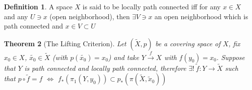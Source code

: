 \documentclass[11pt,a4paper]{article}
\theoremstyle{definition}
\newtheorem{definition}{Definition}[section]
\theoremstyle{plain}
\newtheorem{theorem}[definition]{Theorem}
\theoremstyle{remark}
\newcommand{\1}{\mathbbm{1}}
\begin{document}
\begin{definition}
    A space $X$ is said to be locally path connected iff for any $x \in X$ and any $U \ni x$ (open neighborhood), then $\exists V \ni x$ 
    an open neighborhood which is path connected and $x \in V \subset U$
\end{definition}

\begin{theorem}[The Lifting Criterion]
    Let $(\tilde{X}, p)$ be a covering space of $X$, fix $x_0 \in X$, $\tilde{x_0} \in \tilde{X}$ (with $p(\tilde{x_0}) = x_0$) and 
    take $Y \xrightarrow{f} X$ with $f(y_0) = x_0$. Suppose that $Y$ is path connected and locally path connected, therefore 
    $\exists ! \ \tilde{f} \colon Y \to \tilde{X}$ such that $p \circ \tilde{f} = f$ $\iff$ $f_*(\pi_1(Y,y_0)) \subset p_*(\pi(\tilde{X}, \tilde{x}_0))$ 
\end{theorem}
\end{document}
